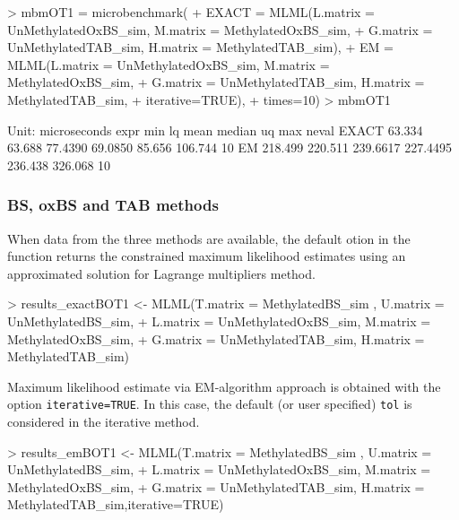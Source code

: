 \documentclass{article}
\begin{document}
\begin{Schunk}
\begin{Sinput}
>  mbmOT1 = microbenchmark(
+     EXACT = MLML(L.matrix = UnMethylatedOxBS_sim, M.matrix = MethylatedOxBS_sim,
+                  G.matrix = UnMethylatedTAB_sim, H.matrix = MethylatedTAB_sim),
+     EM =    MLML(L.matrix = UnMethylatedOxBS_sim, M.matrix = MethylatedOxBS_sim,
+                  G.matrix = UnMethylatedTAB_sim, H.matrix = MethylatedTAB_sim,
+                  iterative=TRUE),
+     times=10)
>  mbmOT1
\end{Sinput}
\begin{Soutput}
Unit: microseconds
  expr     min      lq     mean   median      uq     max neval
 EXACT  63.334  63.688  77.4390  69.0850  85.656 106.744    10
    EM 218.499 220.511 239.6617 227.4495 236.438 326.068    10
\end{Soutput}
\end{Schunk}



\subsubsection{BS, oxBS and TAB methods}

When data from the three methods are available, the default otion in the  function returns the constrained maximum likelihood estimates using an approximated solution for Lagrange multipliers method.


\begin{Schunk}
\begin{Sinput}
> results_exactBOT1 <- MLML(T.matrix = MethylatedBS_sim , U.matrix = UnMethylatedBS_sim,
+ L.matrix = UnMethylatedOxBS_sim, M.matrix = MethylatedOxBS_sim,
+ G.matrix = UnMethylatedTAB_sim, H.matrix = MethylatedTAB_sim)
\end{Sinput}
\end{Schunk}

Maximum likelihood estimate via EM-algorithm approach \cite{Qu:MLML} is obtained with the option \verb|iterative=TRUE|. In this case, the default (or user specified) \verb|tol| is considered in the iterative method.

\begin{Schunk}
\begin{Sinput}
>  results_emBOT1 <- MLML(T.matrix = MethylatedBS_sim , U.matrix = UnMethylatedBS_sim,
+  L.matrix = UnMethylatedOxBS_sim, M.matrix = MethylatedOxBS_sim,
+  G.matrix = UnMethylatedTAB_sim, H.matrix = MethylatedTAB_sim,iterative=TRUE)
\end{Sinput}
\end{Schunk}
\end{document}
